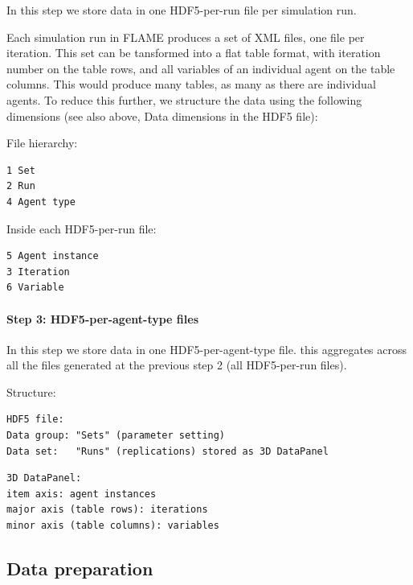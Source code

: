 \documentclass[10pt,a4paper]{article}
\begin{document}
In this step we store data in one HDF5-per-run file per simulation run.

Each simulation run in FLAME produces a set of XML files, one file per iteration. This set can be tansformed into a flat table format, with iteration number on the table rows, and all variables of an individual agent on the table columns.
This would produce many tables, as many as there are individual agents. To reduce this further, we structure the data using the following dimensions (see also above, Data dimensions in the HDF5 file):

File hierarchy:
\begin{verbatim}
1 Set
2 Run
4 Agent type
\end{verbatim}

Inside each HDF5-per-run file:
\begin{verbatim}
5 Agent instance
3 Iteration
6 Variable
\end{verbatim}


\paragraph{Step 3: HDF5-per-agent-type files}

In this step we store data in one HDF5-per-agent-type file. this aggregates across all the files generated at the previous step 2 (all HDF5-per-run files).

Structure:
\begin{verbatim}
HDF5 file:
Data group: "Sets" (parameter setting)
Data set:   "Runs" (replications) stored as 3D DataPanel
\end{verbatim}


\begin{verbatim}
3D DataPanel:
item axis: agent instances
major axis (table rows): iterations
minor axis (table columns): variables
\end{verbatim}



\subsection{Data preparation}
\end{document}
